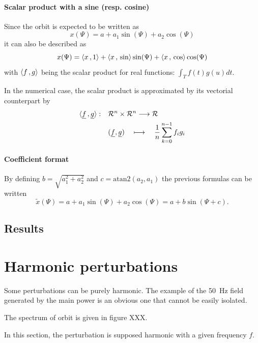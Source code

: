 \paragraph{Scalar product with a sine (resp. cosine)}
Since the orbit is expected to be written as
\begin{equation*}
x(\Psi) = a+ a_1 \sin(\Psi) + a_2 \cos(\Psi)
\end{equation*}
it can also be described as
\begin{equation}
x(\Psi) = \langle x {\,,\,} 1 \rangle + \langle x {\,,\,} \sin \rangle \sin(\Psi) + \langle x {\,,\,} \cos \rangle \cos(\Psi)
\end{equation}
with $\langle f {\,,\,} g \rangle$ being the scalar product for real functions: $\int_T f(t)g(u)dt$.

In the numerical case, the scalar product is approximated by its vectorial counterpart by
\begin{align*}
\langle \underline{f} {\,,\,} \underline{g} \rangle: \quad
 &\mathcal{R}^n \times \mathcal{R}^n \longrightarrow \mathcal{R} \\
 & (\underline{f},\underline{g}) \quad\longmapsto \quad \frac{1}{n}\sum\limits_{k=0}^{n-1} f_i g_i
\end{align*}

\paragraph{Coefficient format}
By defining $b = \sqrt{a_1^2+a_2^2}$ and $c = \mathrm{atan2}(a_2, a_1)$ the previous formulas can be written
\begin{equation*}
\tilde{x}(\Psi) = a + a_1 \sin(\Psi) + a_2 \cos(\Psi) = a + b \sin(\Psi + c).
\end{equation*} 

\subsection{Results}

\section{Harmonic perturbations}
Some perturbations can be purely harmonic. The example of the \SI{50}{\hertz} field generated by the main power is an obvious one that cannot be easily isolated. 

The spectrum of orbit is given in figure XXX. 

In this section, the perturbation is supposed harmonic with a given frequency $f$. 

